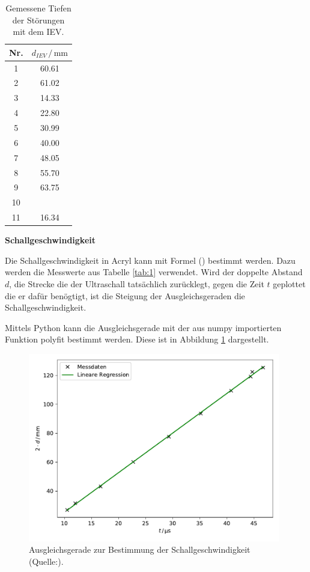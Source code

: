 \begin{table}
    \centering
    \caption{Gemessene Tiefen der Störungen mit dem IEV.}
    \begin{tabular}{c c}
        \toprule
        {Nr.} & {$d_{IEV} \, / \, \si{\milli\meter}$} \\
        \midrule
     1  & 60.61  \\
     2  & 61.02 \\
     3  & 14.33 \\
     4  & 22.80  \\
     5  & 30.99  \\
     6  & 40.00 \\
     7  & 48.05  \\
     8  & 55.70  \\
     9  & 63.75  \\    
     10 &       \\
     11 & 16.34 \\
        \bottomrule
    \end{tabular}
    \label{tab:2}
\end{table}

\noindent
\textbf{Schallgeschwindigkeit}

\noindent
Die Schallgeschwindigkeit in Acryl kann mit Formel ()%
bestimmt werden.
Dazu werden die Messwerte aus Tabelle \ref{tab:1} verwendet.
Wird der doppelte Abstand $d$, die Strecke die der Ultraschall tatsächlich zurücklegt,
gegen die Zeit $t$ geplottet die er dafür benögtigt, ist die Steigung der Ausgleichsgeraden
die Schallgeschwindigkeit.


\noindent
Mittels Python kann die Ausgleichsgerade mit der aus numpy \cite{numpy} importierten Funktion polyfit bestimmt werden.
Diese ist in Abbildung \ref{fig:schall} dargestellt.

\begin{figure}
    \centering
    \includegraphics[width=11cm]{Daten/schall.pdf}
    \caption{Ausgleichsgerade zur Bestimmung der Schallgeschwindigkeit (Quelle:\cite{US1}).}
    \label{fig:schall}
  \end{figure}
  
